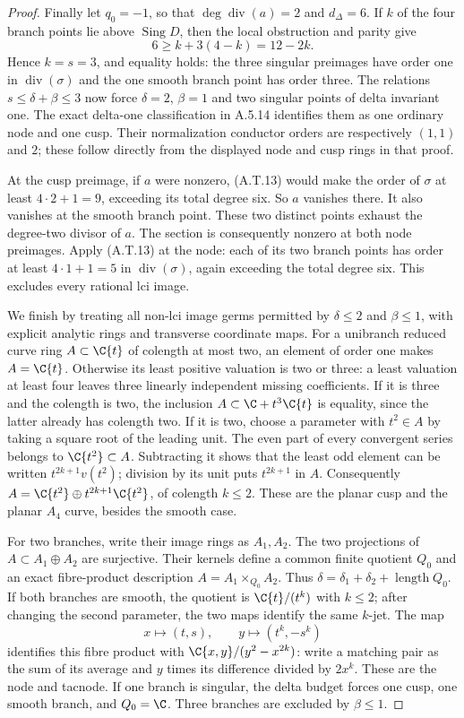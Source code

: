\begin{proof}
Finally let $q_0=-1$, so that $\deg\operatorname{div}(a)=2$
and $d_\Delta=6$. If $k$ of the four branch points
lie above $\operatorname{Sing}D$, then the local
obstruction and parity give
\[
               6\ge k+3(4-k)=12-2k.
\]
Hence $k=s=3$, and equality holds: the three singular
preimages have order one in $\operatorname{div}(\sigma)$
and the one smooth branch point has order three.
The relations $s\le\delta+\beta\le3$ now force
$\delta=2$, $\beta=1$ and two singular points of
delta invariant one. The exact delta-one
classification in A.5.14 identifies them as one
ordinary node and one cusp. Their normalization
conductor orders are respectively $(1,1)$ and $2$;
these follow directly from the displayed node and
cusp rings in that proof.

At the cusp preimage, if $a$ were nonzero,
(A.T.13) would make the order of $\sigma$ at least
$4\cdot2+1=9$, exceeding its total degree six.
So $a$ vanishes there. It also vanishes at the
smooth branch point. These two distinct points
exhaust the degree-two divisor of $a$. The section
is consequently nonzero at both node preimages.
Apply (A.T.13) at the node: each of its two branch
points has order at least $4\cdot1+1=5$ in
$\operatorname{div}(\sigma)$, again exceeding the
total degree six. This excludes every rational lci image.

We finish by treating all non-lci image germs permitted
by $\delta\le2$ and $\beta\le1$, with explicit analytic
rings and transverse coordinate maps. For a unibranch
reduced curve ring $A\subset\C\{t\}$ of colength at
most two, an element of order one makes $A=\C\{t\}$.
Otherwise its least positive valuation is two or three:
a least valuation at least four leaves three linearly
independent missing coefficients. If it is three and
the colength is two, the inclusion
$A\subset\C+t^3\C\{t\}$ is equality, since the latter
already has colength two. If it is two, choose a
parameter with $t^2\in A$ by taking a square root of
the leading unit. The even part of every convergent
series belongs to $\C\{t^2\}\subset A$. Subtracting
it shows that the least odd element can be written
$t^{2k+1}v(t^2)$; division by its unit puts
$t^{2k+1}$ in $A$. Consequently
$A=\C\{t^2\}\oplus t^{2k+1}\C\{t^2\}$, of colength
$k\le2$. These are the planar cusp and the planar
$A_4$ curve, besides the smooth case.

For two branches, write their image rings as $A_1,A_2$.
The two projections of $A\subset A_1\oplus A_2$ are
surjective. Their kernels define a common finite
quotient $Q_0$ and an exact fibre-product description
$A=A_1\times_{Q_0}A_2$. Thus
$\delta=\delta_1+\delta_2+\operatorname{length}Q_0$.
If both branches are smooth, the quotient is
$\C\{t\}/(t^k)$ with $k\le2$; after changing the
second parameter, the two maps identify the same
$k$-jet. The map
\[
 x\longmapsto(t,s),\qquad
 y\longmapsto(t^k,-s^k)
\]
identifies this fibre product with
$\C\{x,y\}/(y^2-x^{2k})$: write a matching pair as
the sum of its average and $y$ times its difference
divided by $2x^k$. These are the node and tacnode.
If one branch is singular, the delta budget forces
one cusp, one smooth branch, and $Q_0=\C$.
Three branches are excluded by $\beta\le1$.


\end{proof}

